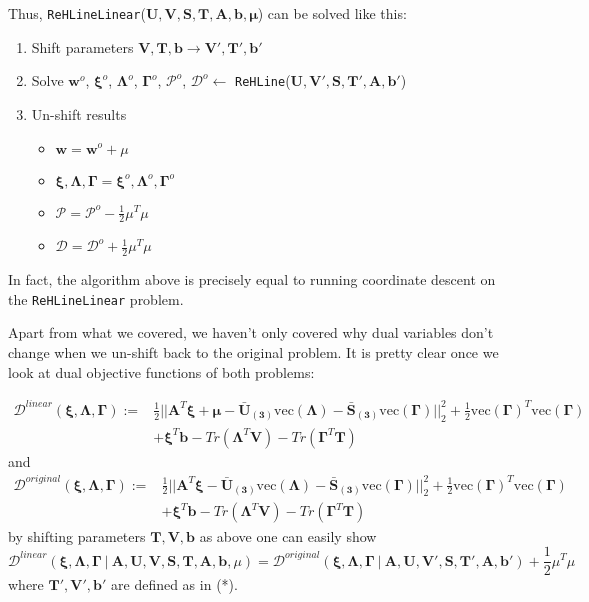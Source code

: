 \documentclass[12pt, a4paper]{article}
\newcommand*{\V}[1]{\mathbf{#1}}
\begin{document}
Thus, \texttt{ReHLineLinear}($\V{U}, \V{V}, \V{S}, \V{T}, \V{A}, \V{b}, \V{\mu}$) can be solved like this:
\begin{enumerate}
    \item Shift parameters $\V{V}, \V{T}, \V{b} \rightarrow \V{V}', \V{T}', \V{b}'$
    \item Solve $\V{w}^o$, $\V{\xi}^o$, $\V{\Lambda}^o$, $\V{\Gamma}^o$, $\mathcal{P}^o$, $\mathcal{D}^o \leftarrow$ \texttt{ReHLine}($\V{U}, \V{V}', \V{S}, \V{T}', \V{A}, \V{b}'$)
    \item Un-shift results
    \begin{itemize}
        \item $\V{w} = \V{w}^o + \mu$ 
        \item $\V{\xi}, \V{\Lambda}, \V{\Gamma} = \V{\xi}^o, \V{\Lambda}^o, \V{\Gamma}^o$
        \item $\mathcal{P} = \mathcal{P}^o - \frac{1}{2} \mu^T \mu$
        \item $\mathcal{D} =\mathcal{D}^o + \frac{1}{2} \mu^T \mu$
    \end{itemize}
\end{enumerate}
In fact, the algorithm above is precisely equal to running coordinate descent on the \texttt{ReHLineLinear} problem. 

Apart from what we covered, we haven't only covered why dual variables don't change when we un-shift back to the original problem. It is pretty clear once we look at dual objective functions of both problems:

\begin{align*}
\mathcal{D}^{linear}(\V{\xi}, \V{\Lambda}, \V{\Gamma}) := & \frac{1}{2} ||\V{A}^T \V{\xi} + \V{\mu} - \V{\bar{U}_{(3)}} \text{vec}(\V{\Lambda}) - \V{\bar{S}_{(3)}} \text{vec} (\V{\Gamma})||_2^2 + \frac{1}{2}\text{vec}(\V{\Gamma})^T \text{vec}(\V{\Gamma}) 
\\ & + \V{\xi}^T \V{b} - Tr(\V{\Lambda}^T \V{V}) - Tr(\V{\Gamma}^T \V{T})
\end{align*}
and
\begin{align*}
\mathcal{D}^{original}(\V{\xi}, \V{\Lambda}, \V{\Gamma}) := & \frac{1}{2} ||\V{A}^T \V{\xi} - \V{\bar{U}_{(3)}} \text{vec}(\V{\Lambda}) - \V{\bar{S}_{(3)}} \text{vec} (\V{\Gamma})||_2^2 + \frac{1}{2}\text{vec}(\V{\Gamma})^T \text{vec}(\V{\Gamma}) 
\\ & + \V{\xi}^T \V{b} - Tr(\V{\Lambda}^T \V{V}) - Tr(\V{\Gamma}^T \V{T})
\end{align*}
by shifting parameters $\V{T}, \V{V}, \V{b}$ as above one can easily show
$$\mathcal{D}^{linear}(\V{\xi}, \V{\Lambda}, \V{\Gamma} \:|\: \V{A}, \V{U}, \V{V}, \V{S}, \V{T}, \V{A}, \V{b}, \mu) = \mathcal{D}^{original}(\V{\xi}, \V{\Lambda}, \V{\Gamma} \:|\: \V{A}, \V{U}, \V{V}', \V{S}, \V{T}', \V{A}, \V{b}') + \frac{1}{2}\mu^T\mu$$
where $\V{T}', \V{V}', \V{b}'$ are defined as in (*). 

% 
% 
\end{document}

